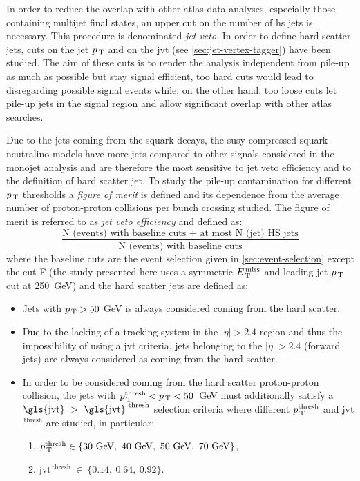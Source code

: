 In order to reduce the overlap with other \gls{atlas} data analyses, especially
those containing multijet final states, an upper cut on the number of \gls{hs}
jets is necessary. This procedure is denominated \emph{jet veto}. In order to
define hard scatter jets, cuts on the jet $p_\mathrm{\, T}$ and on the \gls{jvt} (see
\cref{sec:jet-vertex-tagger}) have been studied. The aim of these cuts is to
render the analysis independent from pile-up as much as possible but stay signal
efficient, too hard cuts would lead to disregarding possible signal events
while, on the other hand, too loose cuts let pile-up jets in the signal region
and allow significant overlap with other \gls{atlas} searches.

Due to the jets coming from the squark decays, the \gls{susy} compressed
squark-neutralino models have more jets compared to other signals considered in
the monojet analysis and are therefore the most sensitive to jet veto efficiency
and to the definition of hard scatter jet. To study the pile-up contamination
for different $p_\mathrm{\, T}$ thresholds a \emph{figure of merit} is defined and its
dependence from the average number of proton-proton collisions per bunch
crossing studied. The figure of merit is referred to as \emph{jet veto
  efficiency } and defined as:
\begin{equation}
  \label{eq:fig_merit}
  \frac{\text{N (events) with baseline cuts + at
      most N (jet) HS jets}}{\text{N (events)
      with baseline cuts}}
\end{equation}
where the baseline cuts are the event selection given in
\cref{sec:event-selection} except the cut F (the study presented here uses a
symmetric $E_\mathrm{\, T}^\mathrm{\, miss}$ and leading jet $p_\mathrm{\, T}$ cut at 250~GeV) and the hard scatter jets
are defined as:
\begin{itemize}
\item Jets with $p_\mathrm{\, T} > 50$ GeV is always considered coming from the hard
  scatter.
\item Due to the lacking of a tracking system in the $|\eta| > 2.4$ region and
  thus the impossibility of using a \gls{jvt} criteria, jets belonging to the
  $|\eta| > 2.4$ (forward jets) are always considered as coming from the hard
  scatter.
\item In order to be considered coming from the hard scatter proton-proton
  collision, the jets with $p_\mathrm{\, T}^{\mathrm{thresh}} < p_\mathrm{\, T} < 50$~GeV must
  additionally satisfy a
  $\mathrm{\gls{jvt}}~>~\mathrm{\gls{jvt}}^{\text{ thresh}}$ selection criteria
  where different $p_\mathrm{\, T}^{\mathrm{thresh}}$ and \gls{jvt}$^{\mathrm{\, thresh}}$
  are studied, in particular:
  \begin{enumerate}[A -]
  \item
    $p_\mathrm{\, T}^{\mathrm{thresh}} \in
    \{30~\mathrm{GeV},~40~\mathrm{GeV},~50~\mathrm{GeV}, ~70~\mathrm{GeV}\}$,
  \item \gls{jvt}$^{\mathrm{\, thresh}}~\in~ \{0.14,~0.64,~0.92\}$.
  \end{enumerate}
\end{itemize}

